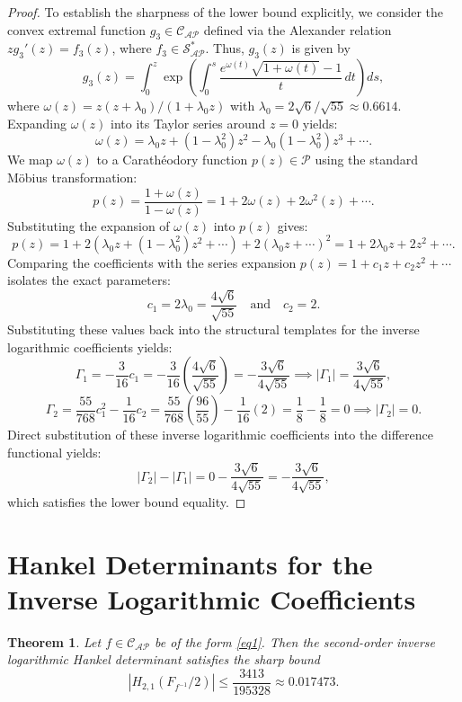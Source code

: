 \documentclass[10pt,a4paper]{amsart}
\newtheorem{theo}{Theorem}[section]
\numberwithin{equation}{section}
\begin{document}
\begin{proof}
To establish the sharpness of the lower bound explicitly, we consider the convex extremal function $g_3 \in \mathcal{C}_{\mathcal{AP}}$ defined via the Alexander relation $z g_3'(z) = f_3(z)$, where $f_3 \in \mathcal{S}_{\mathcal{AP}}^{*}$. Thus, $g_3(z)$ is given by
\begin{equation}\label{ext3}
g_3(z) = \int_0^z \exp \left( \int_0^s \frac{e^{\omega(t)}\sqrt{1+\omega(t)}-1}{t}\,dt \right) ds,
\end{equation}
where $\omega(z) = z (z + \lambda_0)/(1 + \lambda_0 z)$ with $\lambda_0 = 2\sqrt{6}/\sqrt{55} \approx 0.6614$.
Expanding $\omega(z)$ into its Taylor series around $z=0$ yields:
\[
\omega(z) = \lambda_0 z + (1 - \lambda_0^2)z^2 - \lambda_0(1 - \lambda_0^2)z^3 + \cdots.
\]
We map $\omega(z)$ to a Carath\'{e}odory function $p(z) \in \mathcal{P}$ using the standard M\"{o}bius transformation:
\[
p(z) = \frac{1 + \omega(z)}{1 - \omega(z)} = 1 + 2\omega(z) + 2\omega^2(z) + \cdots.
\]
Substituting the expansion of $\omega(z)$ into $p(z)$ gives:
\[
p(z) = 1 + 2\left( \lambda_0 z + (1 - \lambda_0^2)z^2 + \cdots \right) + 2\left( \lambda_0 z + \cdots \right)^2 = 1 + 2\lambda_0 z + 2z^2 + \cdots.
\]
Comparing the coefficients with the series expansion $p(z) = 1 + c_1 z + c_2 z^2 + \cdots$ isolates the exact parameters:
\[
c_1 = 2\lambda_0 = \frac{4\sqrt{6}}{\sqrt{55}} \quad \text{and} \quad c_2 = 2.
\]
Substituting these values back into the structural templates for the inverse logarithmic coefficients yields:
\[
\Gamma_1 = -\frac{3}{16}c_1 = -\frac{3}{16}\left( \frac{4\sqrt{6}}{\sqrt{55}} \right) = -\frac{3\sqrt{6}}{4\sqrt{55}} \implies |\Gamma_1| = \frac{3\sqrt{6}}{4\sqrt{55}},
\]
\[
\Gamma_2 = \frac{55}{768}c_1^2 - \frac{1}{16}c_2 = \frac{55}{768}\left(\frac{96}{55}\right) - \frac{1}{16}(2) = \frac{1}{8} - \frac{1}{8} = 0 \implies |\Gamma_2| = 0.
\]
Direct substitution of these inverse logarithmic coefficients into the difference functional yields:
\[
|\Gamma_2| - |\Gamma_1| = 0 - \frac{3\sqrt{6}}{4\sqrt{55}} = -\frac{3\sqrt{6}}{4\sqrt{55}},
\]
which satisfies the lower bound equality.
\end{proof}

\section{Hankel Determinants for the Inverse Logarithmic Coefficients}
\begin{theo}\label{T3}
Let $f \in \mathcal{C}_{\mathcal{AP}}$ be of the form \eqref{eq1}. Then the second-order inverse logarithmic Hankel determinant satisfies the sharp bound
\begin{equation}\label{po11}
\left| H_{2,1}\left(F_{f^{-1}}/2\right) \right| \leq \frac{3413}{195328} \approx 0.017473.
\end{equation}
\end{theo}
\end{document}
